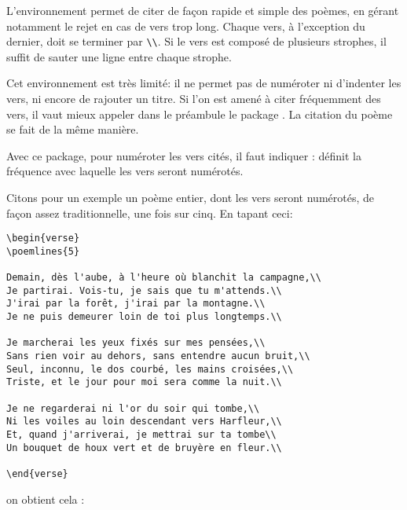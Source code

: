 L'environnement   permet de citer de façon rapide et simple des poèmes, en gérant notamment le rejet en cas de vers trop long. Chaque vers, à l'exception du dernier, doit se terminer par \verb|\\|. Si le vers est composé de plusieurs strophes, il suffit de sauter une ligne entre chaque strophe.    

Cet environnement est très limité: il ne permet pas de numéroter ni d'indenter les vers, ni encore de rajouter un titre. Si l'on est amené à citer fréquemment des vers, il vaut mieux appeler dans le préambule le package . La citation du poème se fait de la même manière.


Avec ce package, pour numéroter les vers cités, il faut indiquer  :   
définit la fréquence avec laquelle les vers seront numérotés. 


Citons pour un exemple un poème entier, dont les vers seront numérotés, de façon assez traditionnelle, une fois sur cinq. En tapant ceci:
\begin{verbatim}
\begin{verse}
\poemlines{5}

Demain, dès l'aube, à l'heure où blanchit la campagne,\\
Je partirai. Vois-tu, je sais que tu m'attends.\\
J'irai par la forêt, j'irai par la montagne.\\
Je ne puis demeurer loin de toi plus longtemps.\\

Je marcherai les yeux fixés sur mes pensées,\\
Sans rien voir au dehors, sans entendre aucun bruit,\\
Seul, inconnu, le dos courbé, les mains croisées,\\
Triste, et le jour pour moi sera comme la nuit.\\

Je ne regarderai ni l'or du soir qui tombe,\\
Ni les voiles au loin descendant vers Harfleur,\\
Et, quand j'arriverai, je mettrai sur ta tombe\\
Un bouquet de houx vert et de bruyère en fleur.\\

\end{verse}
\end{verbatim}

on obtient cela :

